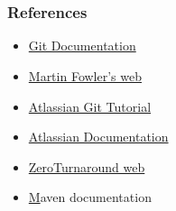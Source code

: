 
\section*{}
\begin{frame}
\frametitle{References}
\begin{itemize}
	\item \href{https://git-scm.com/documentation}{Git Documentation}
	\item \href{https://martinfowler.com}{Martin Fowler’s web}
	\item \href{https://www.atlassian.com/git/tutorials}{Atlassian Git Tutorial}
	\item \href{https://www.atlassian.com/continuous-delivery}{Atlassian Documentation}
	\item \href{https://zeroturnaround.com/rebellabs/java-build-tools-part-2-a-decision-makers-comparison-of-maven-gradle-and-ant-ivy/}{ZeroTurnaround web}
	\item \href{https://maven.apache.org/index.html} Maven documentation
\end{itemize}
\end{frame}



